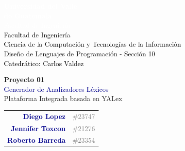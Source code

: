 \documentclass[12pt,a4paper]{article}
\begin{document}
\begin{titlepage}

\vspace*{0.7cm}
\begin{center}
  {\Huge\bfseries\textcolor{white}{Universidad del Valle}}\\[6pt]
  {\Huge\bfseries\textcolor{white}{de Guatemala}}\\[14pt]
  {\large\textcolor{white}{Facultad de Ingeniería}}\\[4pt]
  {\large\textcolor{black}{Facultad de Ingeniería}}\\[4pt]
  {\large\textcolor{black}{Ciencia de la Computación y Tecnologías de la Información}}\\[1pt]
  {\normalsize\textcolor{black}{Diseño de Lenguajes de Programación - Sección 10}}\\[4pt]
  {\normalsize\textcolor{black}{Catedrático: Carlos Valdez}}
\end{center}

\vspace{3.5cm}

\begin{center}
  {\fontsize{28}{34}\selectfont\bfseries\textcolor{sectionblue}{Proyecto 01}}\\[18pt]
  {\fontsize{20}{26}\selectfont\textcolor{darkblue}{Generador de Analizadores Léxicos}}\\[10pt]
  {\Large\textcolor{uvggreen}{Plataforma Integrada basada en YALex}}
\end{center}

\vspace{3cm}

\begin{center}
  \renewcommand{\arraystretch}{1.4}
  \begin{tabular}{r l}
    \textcolor{darkblue}{\textbf{Diego Lopez}}      & \textcolor{gray}{\#23747} \\
    \textcolor{darkblue}{\textbf{Jennifer Toxcon}}  & \textcolor{gray}{\#21276} \\
    \textcolor{darkblue}{\textbf{Roberto Barreda}}  & \textcolor{gray}{\#23354} \\
  \end{tabular}
\end{center}

\vfill
{}
\end{titlepage}
\end{document}
